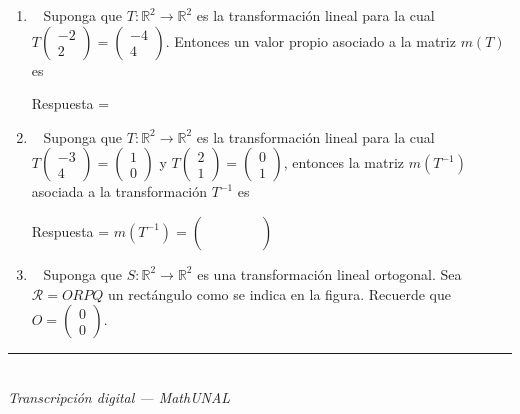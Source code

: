 \documentclass[11pt]{article}
\newcommand{\ptsbox}[1]{\fbox{\footnotesize #1}~}
\newcommand{\vect}[2]{\begin{pmatrix}#1\\#2\end{pmatrix}}
\newcommand{\examfooter}{%
  \vfill
  \rule{\linewidth}{0.4pt}\\[1pt]
  {\scriptsize\textit{Transcripción digital --- MathUNAL}\hfill\textcolor{unalblue}{\textbf{\thepage}}}
}
\begin{document}
\begin{enumerate}[leftmargin=1.6em]
Respuesta \underline{\hspace{4cm}}

\item \ptsbox{4pt} Suponga que $T:\mathbb{R}^2\to\mathbb{R}^2$ es la transformación lineal para la cual $T\vect{-2}{2} = \vect{-4}{4}$. Entonces un valor propio asociado a la matriz $m(T)$ es

Respuesta = \underline{\hspace{4cm}}

\item \ptsbox{4pt} Suponga que $T:\mathbb{R}^2\to\mathbb{R}^2$ es la transformación lineal para la cual $T\vect{-3}{4} = \vect{1}{0}$ y $T\vect{2}{1} = \vect{0}{1}$, entonces la matriz $m(T^{-1})$ asociada a la transformación $T^{-1}$ es

Respuesta = $m(T^{-1}) = \begin{pmatrix} \phantom{-0} & \phantom{-0} \\[4pt] \phantom{-0} & \phantom{-0} \end{pmatrix}$

\vspace{10pt}

\item \ptsbox{8pt} Suponga que $S:\mathbb{R}^2\to\mathbb{R}^2$ es una transformación lineal ortogonal. Sea $\mathcal{R} = ORPQ$ un rectángulo como se indica en la figura. Recuerde que $O = \vect{0}{0}$.

\begin{center}
\end{center}


\end{enumerate}

\examfooter
\end{document}
